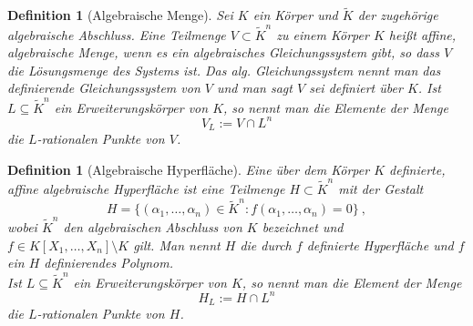 \documentclass[a4paper,oneside, 11pt, openany%
]{article}
\newcommand{\coloneqq}{:=}
\theoremstyle{custom}
\theoremstyle{custom}
\newtheorem{definition}[theorem]{Definition}
\begin{document}
	\begin{definition}[Algebraische Menge]\label{def:alg_menge}
		Sei $K$ ein Körper und $\tilde{K}$ der zugehörige algebraische Abschluss.
		Eine Teilmenge $V \subset \tilde{K}^n$ zu einem Körper $K$ heißt affine, algebraische Menge, wenn es ein algebraisches Gleichungssystem gibt, so dass $V$ die Lösungsmenge des Systems ist. Das alg. Gleichungssystem nennt man das definierende Gleichungssystem von $V$ und man sagt $V$ sei definiert über $K$.
		Ist $L \subseteq \tilde{K}^{n}$ ein Erweiterungskörper von $K$, so nennt man die Elemente der Menge
		\begin{equation*}
			V_{L} \coloneqq V \cap L^{n}
		\end{equation*}
		die $L$-rationalen Punkte von $V$.
	\end{definition} 
	\begin{definition}[Algebraische Hyperfläche]
		Eine über dem Körper $K$ definierte, affine algebraische Hyperfläche ist eine Teilmenge $H \subset \tilde{K}^{n}$ mit der Gestalt
		\begin{equation}
			H = \{\left( \alpha_{1},\dots,\alpha_{n}\right) \in \tilde{K}^{n} \colon f\left(  \alpha_{1},\dots,\alpha_{n}\right) = 0  \} \ , 
		\end{equation}
		wobei $\tilde{K}^{n}$ den algebraischen Abschluss von $K$ bezeichnet und \newline ${f \in K\left[ X_{1},\dots, X_{n}\right] \setminus K}$ gilt. Man nennt $H$ die durch $f$ definierte Hyperfläche und $f$ ein $H$ definierendes Polynom.\\
		Ist $L \subseteq \tilde{K}^{n}$ ein Erweiterungskörper von $K$, so nennt man die Element der Menge
		\begin{equation*}
			H_{L} \coloneqq H \cap L^{n}
		\end{equation*}
		die $L$-rationalen Punkte von $H$.
	\end{definition}
	
\end{document}
